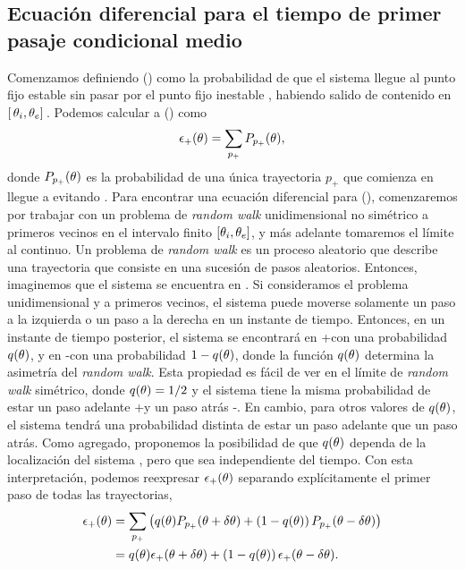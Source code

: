 \documentclass[./main.tex]{subfiles}
\begin{document}
\subsection{Ecuación diferencial para el tiempo de primer pasaje condicional medio}

Comenzamos definiendo \epsplus(\xx) como la probabilidad de que el sistema llegue al punto fijo estable \xxe sin pasar por el punto fijo inestable \xxi, habiendo salido de \xx contenido en $[ \,\theta_i,\theta_e ]\,$. Podemos calcular a \epsplus(\xx) como 
\begin{equation}
    \epsilon_{+}(\theta) = \sum_{p_{+}} P_{p_{+}}(\theta),
    \label{C6_eq:mFPT_eps_def}
\end{equation}
donde $P_{p_{+}}(\theta)$ es la probabilidad de una única trayectoria $p_{+}$ que comienza en \xx llegue a \xxe evitando \xxi. Para encontrar una ecuación diferencial para \epsplus(\xx), comenzaremos por trabajar con un problema de \textit{random walk} unidimensional no simétrico a primeros vecinos en el intervalo finito $[\theta_i,\theta_e ]$, y más adelante tomaremos el límite al continuo. Un problema de \textit{random walk} es un proceso aleatorio que describe una trayectoria que consiste en una sucesión de pasos aleatorios. Entonces, imaginemos que el sistema se encuentra en \xx. Si consideramos el problema unidimensional y a primeros vecinos, el sistema puede moverse solamente un paso a la izquierda o un paso a la derecha en un instante de tiempo. Entonces, en un instante de tiempo posterior, el sistema se encontrará en \xx+\deltax con una probabilidad $q(\theta)$, y en \xx-\deltax con una probabilidad $1-q(\theta)$, donde la función $q(\theta)$ determina la asimetría del \textit{random walk}. Esta propiedad es fácil de ver en el límite de \textit{random walk} simétrico, donde $q(\theta) = 1/2$ y el sistema tiene la misma probabilidad de estar un paso adelante \xx+\deltax y un paso atrás \xx-\deltax. En cambio, para otros valores de $q(\theta)$, el sistema tendrá una probabilidad distinta de estar un paso adelante que un paso atrás. Como agregado, proponemos la posibilidad de que $q(\theta)$ dependa de la localización del sistema \xx, pero que sea independiente del tiempo. Con esta interpretación, podemos reexpresar $ \epsilon_{+}(\theta)$ separando explícitamente el primer paso de todas las trayectorias,
\begin{align}
    \epsilon_{+}(\theta) &= \sum_{p_{+}} \left( q(\theta) P_{p_{+}}(\theta + \delta\theta) + \left(1-q(\theta)\right) P_{p_{+}}(\theta - \delta\theta) \right) \nonumber \\
    & = q(\theta) \epsilon_{+}(\theta+\delta\theta) +  \left(1-q(\theta)\right) \epsilon_{+}(\theta - \delta\theta) 
    \label{C6_eq:mFPT_eps_S1}.
\end{align}
\end{document}
